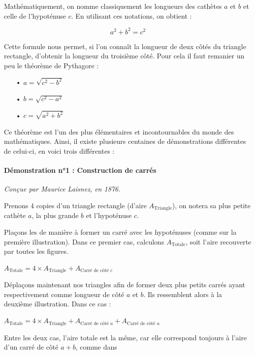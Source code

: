 \documentclass[a4paper, twoside]{article}
\begin{document}
Mathématiquement, on nomme classiquement les longueurs des cathètes $a$ et $b$ et celle
de l'hypoténuse $c$. En utilisant ces notations, on obtient :

$$a^2 + b^2 = c^2 $$

Cette formule nous permet, si l'on connaît la longueur de deux côtés du triangle rectangle,
d'obtenir la longueur du troisième côté. Pour cela il faut remanier un peu le théorème de Pythagore :

\begin{itemize}
	\item[•] $a = \sqrt{c^2 - b^2}$ 
	\item[•] $b = \sqrt{c^2 - a^2}$ 
	\item[•] $c = \sqrt{a^2 + b^2}$ 
\end{itemize}

\smallbreak

Ce théorème est l'un des plus élémentaires et incontournables du monde des mathématiques. 
Ainsi, il existe plusieurs centaines de démonstrations différentes de celui-ci, 
en voici trois différentes :

\paragraph*{Démonstration n°1 : Construction de carrés}

\textit{Conçue par Maurice Laisnez, en 1876.}

Prenons 4 copies d'un triangle rectangle (d'aire $A_{\text{Triangle}}$), 
on notera sa plus petite cathète $a$, la plus grande $b$ et l'hypoténuse $c$.

Plaçons les de manière à former un carré avec les hypoténuses (comme sur la première illustration).
Dans ce premier cas, calculons $A_{\text{Totale}}$, soit l'aire recouverte par toutes les figures.

$A_{\text{Totale}} = 4 \times A_{\text{Triangle}} + A_{\text{Carré de côté }c}$

Déplaçons maintenant nos triangles afin de former deux plus petits carrés ayant respectivement 
comme longueur de côté $a$ et $b$. Ils ressemblent alors à la deuxième illustration. 
Dans ce cas :

$A_{\text{Totale}} = 4 \times A_{\text{Triangle}} + A_{\text{Carré de côté }a} + A_{\text{Carré de côté }a}$

Entre les deux cas, l'aire totale est la même, car elle correspond toujours à l'aire d'un carré
de côté $a+b$, comme dans 
\end{document}
